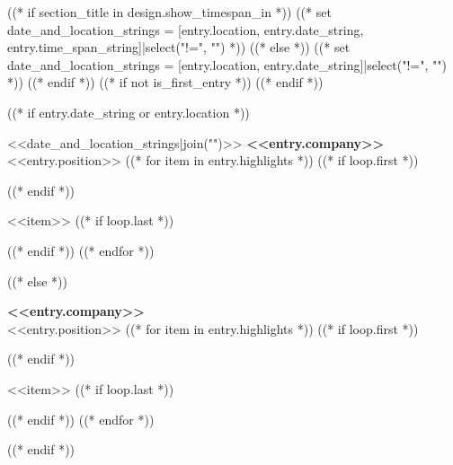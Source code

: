 ((* if section_title in design.show_timespan_in *))
    ((* set date_and_location_strings = [entry.location, entry.date_string, entry.time_span_string]|select("!=", "") *))
((* else *))
    ((* set date_and_location_strings = [entry.location, entry.date_string]|select("!=", "") *))
((* endif *))
((* if not is_first_entry *))
\vspace{<<design.margins.entry_area.vertical_between>>}
((* endif *))

((* if entry.date_string or entry.location *))
\begin{twocolentry}{
    <<date_and_location_strings|join("\n\n")>>
}
    \textbf{<<entry.company>>} \\ <<entry.position>>
    ((* for item in entry.highlights *))
        ((* if loop.first *))
    \begin{highlights}
        ((* endif *))
        \item <<item>>
        ((* if loop.last *))
    \end{highlights}
        ((* endif *))
    ((* endfor *))
\end{twocolentry}
((* else *))
\begin{onecolentry}
    \textbf{<<entry.company>>} \\ <<entry.position>>
    ((* for item in entry.highlights *))
        ((* if loop.first *))
    \begin{highlights}
        ((* endif *))
        \item <<item>>
        ((* if loop.last *))
    \end{highlights}
        ((* endif *))
    ((* endfor *))
\end{onecolentry}
((* endif *))